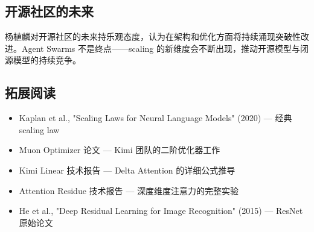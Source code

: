 \documentclass[a4paper]{article}
\begin{document}
\subsection{开源社区的未来}

杨植麟对开源社区的未来持乐观态度，认为在架构和优化方面将持续涌现突破性改进。Agent Swarms 不是终点——scaling 的新维度会不断出现，推动开源模型与闭源模型的持续竞争。

\subsection{拓展阅读}

\begin{itemize}
    \item Kaplan et al., "Scaling Laws for Neural Language Models" (2020) --- 经典 scaling law
    \item Muon Optimizer 论文 --- Kimi 团队的二阶优化器工作
    \item Kimi Linear 技术报告 --- Delta Attention 的详细公式推导
    \item Attention Residue 技术报告 --- 深度维度注意力的完整实验
    \item He et al., "Deep Residual Learning for Image Recognition" (2015) --- ResNet 原始论文
\end{itemize}

\end{document}

